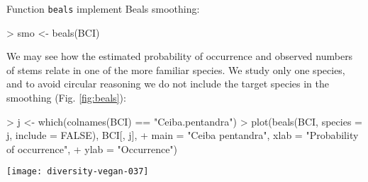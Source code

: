\documentclass[a4paper,10pt]{amsart}
\begin{document}
Function \texttt{beals} implement Beals smoothing:
\begin{Schunk}
\begin{Sinput}
> smo <- beals(BCI)
\end{Sinput}
\end{Schunk}
We may see how the estimated probability of occurrence and observed
numbers of stems relate in one of the more familiar species. We study
only one species, and to avoid circular reasoning we do not include
the target species in the smoothing (Fig. \ref{fig:beals}):
\begin{Schunk}
\begin{Sinput}
> j <- which(colnames(BCI) == "Ceiba.pentandra")
> plot(beals(BCI, species = j, include = FALSE), BCI[, j], 
+     main = "Ceiba pentandra", xlab = "Probability of occurrence", 
+     ylab = "Occurrence")
\end{Sinput}
\end{Schunk}
\begin{SCfigure}
\texttt{[image: diversity-vegan-037]}
\caption{Beals smoothing for \emph{Ceiba pentandra}.}
\label{fig:beals}
\end{SCfigure}
\end{document}
